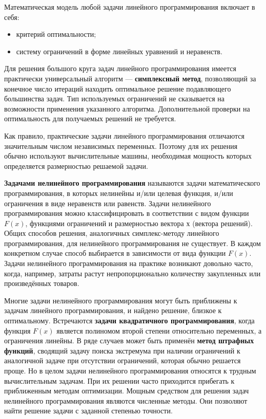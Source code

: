 Математическая модель любой задачи линейного
программирования включает в себя:

\begin{itemize}
\setlength{\itemsep}{0.2ex}
\item критерий оптимальности;

\item систему ограничений в форме
  линейных уравнений и неравенств.

\end{itemize}

Для решения большого круга задач линейного программирования имеется
практически универсальный алгоритм --- \textbf{симплексный метод},
позволяющий за конечное число итераций находить оптимальное решение
подавляющего большинства задач. Тип используемых ограничений не
сказывается на возможности применения указанного
алгоритма. Дополнительной проверки на оптимальность для получаемых
решений не требуется.

Как правило, практические задачи линейного программирования отличаются 
значительным числом независимых переменных. Поэтому для их решения
обычно используют вычислительные машины, необходимая мощность которых
определяется размерностью решаемой задачи.

\textbf{Задачами нелинейного программирования} называются
задачи математического программирования, в которых нелинейны и/или
целевая функция, и/или ограничения в виде неравенств или равенств.
Задачи нелинейного программирования можно классифицировать в
соответствии с видом функции $ F(x) $, функциями ограничений и
размерностью вектора $ х $ (вектора решений). Общих способов решения,
аналогичных симплекс-методу линейного программирования, для
нелинейного программирования не существует. В каждом конкретном
случае способ выбирается в зависимости от вида функции $ F(x) $. Задачи
нелинейного программирования на практике возникают довольно часто,
когда, например, затраты растут непропорционально количеству
закупленных или произведённых товаров.

Многие задачи нелинейного программирования могут быть приближены к задачам линейного
программирования, и найдено решение, близкое к оптимальному. Встречаются
\textbf{задачи квадратичного программирования}, когда
функция $ F(x) $ является полиномом второй степени относительно переменных, а
ограничения линейны. В ряде случаев может быть применён \textbf{метод штрафных
функций}, сводящий задачу поиска экстремума при наличии ограничений к
аналогичной задаче при отсутствии ограничений, которая обычно решается
проще. Но в целом задачи нелинейного программирования относятся к
трудным вычислительным задачам. При их решении часто приходится
прибегать к приближенным методам оптимизации. Мощным средством для
решения задач нелинейного программирования являются численные
методы. Они позволяют найти решение задачи с заданной степенью
точности. 

